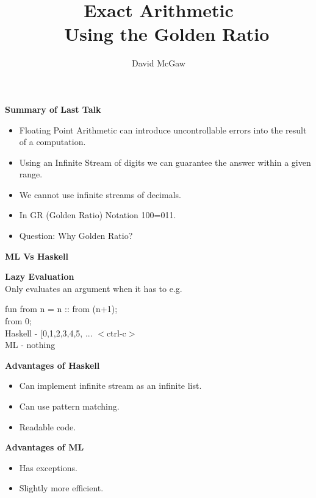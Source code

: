 \documentclass{csslides}\raggedright
\begin{document}
\title{Exact Arithmetic \\~ Using the Golden Ratio \\ [5ex]}
\author{David McGaw}
\date[CS]{}


\begin{slide}{}
{\bf Summary of Last Talk}
\begin{itemize}
\item Floating Point Arithmetic can introduce uncontrollable errors into the result of a computation.
\item Using an Infinite Stream of digits we can guarantee the answer within a given range.
\item We cannot use infinite streams of decimals.
\item In GR (Golden Ratio) Notation 100=011.
\item Question: Why Golden Ratio?
\end{itemize}
\end{slide}


\begin{slide}{}
\vfill

\begin{center}
{\bf ML Vs Haskell}
\end{center}

{\bf Lazy Evaluation} \\
Only evaluates an argument when it has to e.g.

fun from n = n :: from (n+1); \\


from 0; \\
Haskell - [0,1,2,3,4,5, ... $<$ctrl-c$>$ \\
ML -  nothing

{\bf Advantages of Haskell}
\begin{itemize}
\item Can implement infinite stream as an infinite list.
\item Can use pattern matching.
\item Readable code.
\end{itemize}

{\bf Advantages of ML}
\begin{itemize}
\item Has exceptions.
\item Slightly more efficient.
\end{itemize}
\end{slide}
\end{document}

